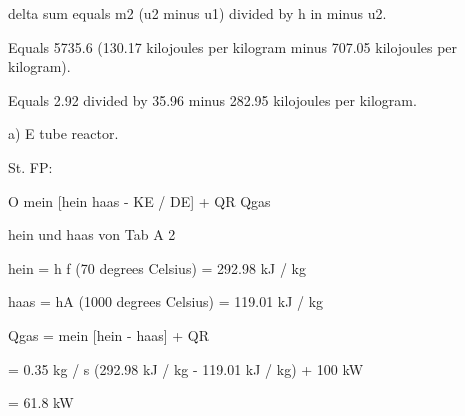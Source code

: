 delta sum equals m2 (u2 minus u1) divided by h in minus u2.

Equals 5735.6 (130.17 kilojoules per kilogram minus 707.05 kilojoules per kilogram).

Equals 2.92 divided by 35.96 minus 282.95 kilojoules per kilogram.

a) E tube reactor.  

St. FP:  

O mein [hein haas - KE / DE] + QR Qgas  

hein und haas von Tab A 2  

hein = h f (70 degrees Celsius) = 292.98 kJ / kg  

haas = hA (1000 degrees Celsius) = 119.01 kJ / kg  

Qgas = mein [hein - haas] + QR  

= 0.35 kg / s (292.98 kJ / kg - 119.01 kJ / kg) + 100 kW  

= 61.8 kW